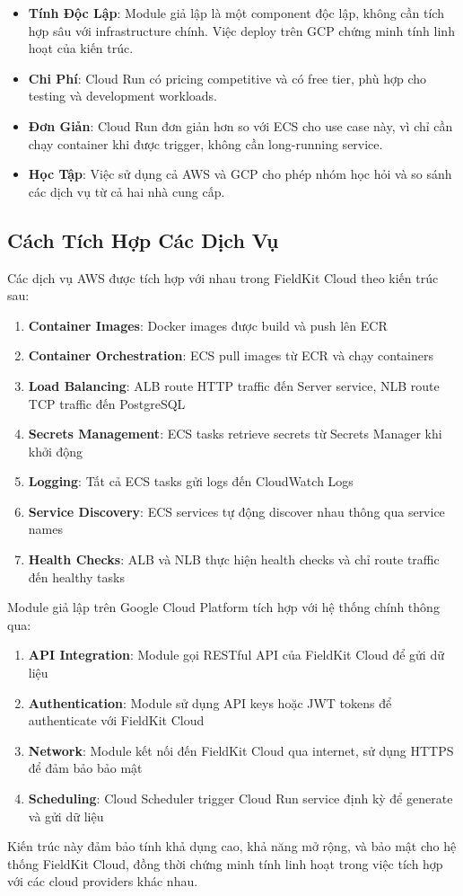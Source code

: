 \begin{itemize}
    \item \textbf{Tính Độc Lập}: Module giả lập là một component độc lập, không cần tích hợp sâu với infrastructure chính. Việc deploy trên GCP chứng minh tính linh hoạt của kiến trúc.
    \item \textbf{Chi Phí}: Cloud Run có pricing competitive và có free tier, phù hợp cho testing và development workloads.
    \item \textbf{Đơn Giản}: Cloud Run đơn giản hơn so với ECS cho use case này, vì chỉ cần chạy container khi được trigger, không cần long-running service.
    \item \textbf{Học Tập}: Việc sử dụng cả AWS và GCP cho phép nhóm học hỏi và so sánh các dịch vụ từ cả hai nhà cung cấp.
\end{itemize}

\subsection{Cách Tích Hợp Các Dịch Vụ}

Các dịch vụ AWS được tích hợp với nhau trong FieldKit Cloud theo kiến trúc sau:

\begin{enumerate}
    \item \textbf{Container Images}: Docker images được build và push lên ECR
    \item \textbf{Container Orchestration}: ECS pull images từ ECR và chạy containers
    \item \textbf{Load Balancing}: ALB route HTTP traffic đến Server service, NLB route TCP traffic đến PostgreSQL
    \item \textbf{Secrets Management}: ECS tasks retrieve secrets từ Secrets Manager khi khởi động
    \item \textbf{Logging}: Tất cả ECS tasks gửi logs đến CloudWatch Logs
    \item \textbf{Service Discovery}: ECS services tự động discover nhau thông qua service names
    \item \textbf{Health Checks}: ALB và NLB thực hiện health checks và chỉ route traffic đến healthy tasks
\end{enumerate}

Module giả lập trên Google Cloud Platform tích hợp với hệ thống chính thông qua:

\begin{enumerate}
    \item \textbf{API Integration}: Module gọi RESTful API của FieldKit Cloud để gửi dữ liệu
    \item \textbf{Authentication}: Module sử dụng API keys hoặc JWT tokens để authenticate với FieldKit Cloud
    \item \textbf{Network}: Module kết nối đến FieldKit Cloud qua internet, sử dụng HTTPS để đảm bảo bảo mật
    \item \textbf{Scheduling}: Cloud Scheduler trigger Cloud Run service định kỳ để generate và gửi dữ liệu
\end{enumerate}

Kiến trúc này đảm bảo tính khả dụng cao, khả năng mở rộng, và bảo mật cho hệ thống FieldKit Cloud, đồng thời chứng minh tính linh hoạt trong việc tích hợp với các cloud providers khác nhau.

